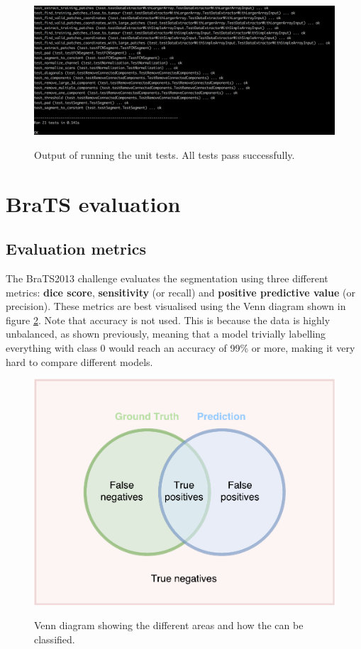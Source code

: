 \documentclass[12pt,a4paper,twoside,openright]{report}
\begin{document}
\begin{figure}[h]
	\centering
	\includegraphics[width = \textwidth]{unit_test_output}
	\label{fig:unit_test_output}
	\caption{Output of running the unit tests. All tests pass successfully.}
\end{figure}

\section{BraTS evaluation}
\subsection{Evaluation metrics}
The BraTS2013 challenge \cite{brats-proceedings} evaluates the segmentation using three different metrics: \textbf{dice score}, \textbf{sensitivity} (or recall) and \textbf{positive predictive value} (or precision). These metrics are best visualised using the Venn diagram shown in figure \ref{fig:evaluation_venn_diagram}.  Note that accuracy is not used. This is because the data is highly unbalanced, as shown previously, meaning that a model trivially labelling everything with class 0 would reach an accuracy of 99\% or more, making it very hard to compare different models.

\begin{figure}
	\centering
	\includegraphics[scale = 0.5]{evaluation_venn_diagram}
	\label{fig:evaluation_venn_diagram}
	\caption{Venn diagram showing the different areas and how the can be classified.}
\end{figure}
\end{document}
